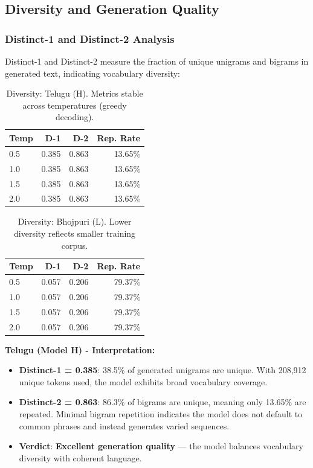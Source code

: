 \documentclass[11pt,a4paper]{article}
\begin{document}
\subsection{Diversity and Generation Quality}

\subsubsection{Distinct-1 and Distinct-2 Analysis}

Distinct-1 and Distinct-2 measure the fraction of unique unigrams and bigrams in generated text, indicating vocabulary diversity:

\begin{table}[H]
\centering
\begin{tabular}{lrrr}
\toprule
\textbf{Temp} & \textbf{D-1} & \textbf{D-2} & \textbf{Rep. Rate} \\
\midrule
0.5 & 0.385 & 0.863 & 13.65\% \\
1.0 & 0.385 & 0.863 & 13.65\% \\
1.5 & 0.385 & 0.863 & 13.65\% \\
2.0 & 0.385 & 0.863 & 13.65\% \\
\bottomrule
\end{tabular}
\caption{Diversity: Telugu (H). Metrics stable across temperatures (greedy decoding).}
\label{table:diversity_telugu}
\end{table}

\begin{table}[H]
\centering
\begin{tabular}{lrrr}
\toprule
\textbf{Temp} & \textbf{D-1} & \textbf{D-2} & \textbf{Rep. Rate} \\
\midrule
0.5 & 0.057 & 0.206 & 79.37\% \\
1.0 & 0.057 & 0.206 & 79.37\% \\
1.5 & 0.057 & 0.206 & 79.37\% \\
2.0 & 0.057 & 0.206 & 79.37\% \\
\bottomrule
\end{tabular}
\caption{Diversity: Bhojpuri (L). Lower diversity reflects smaller training corpus.}
\label{table:diversity_bhojpuri}
\end{table}

\textbf{Telugu (Model H) - Interpretation:}
\begin{itemize}
    \item \textbf{Distinct-1 = 0.385}: 38.5\% of generated unigrams are unique. With 208,912 unique tokens used, the model exhibits broad vocabulary coverage.
    \item \textbf{Distinct-2 = 0.863}: 86.3\% of bigrams are unique, meaning only 13.65\% are repeated. Minimal bigram repetition indicates the model does not default to common phrases and instead generates varied sequences.
    \item \textbf{Verdict}: \textbf{Excellent generation quality} — the model balances vocabulary diversity with coherent language.
\end{itemize}
\end{document}
